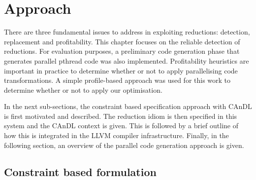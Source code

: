 

\section{Approach}

    There are three fundamental issues to address in exploiting reductions:
    detection, replacement and profitability.
    This chapter focuses on the reliable detection of reductions.
    For evaluation purposes, a preliminary code generation phase that generates
    parallel pthread code was also implemented.
    Profitability heuristics are important in practice to determine whether or
    not to apply parallelising code transformations.
    A simple profile-based approach was used for this work to determine whether
    or not to apply our optimisation.


    In the next sub-sections, the constraint based specification approach with
    CAnDL is first motivated and described.
    The reduction idiom is then specified in this system and the CAnDL context
    is given.
    This is followed by a brief outline of how this is integrated in the
    LLVM compiler infrastructure.
    Finally, in the following section, an overview of the parallel code
    generation approach is given.

\subsection{Constraint based formulation}

